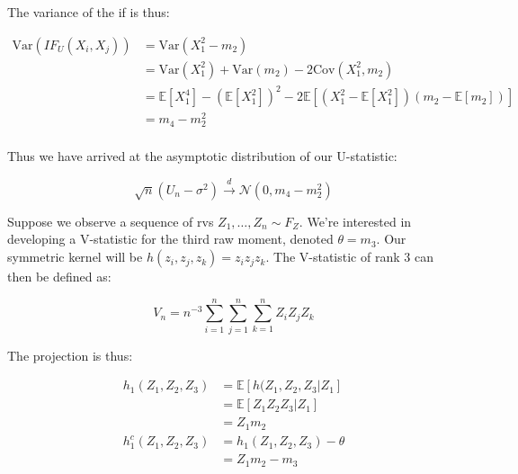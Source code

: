 \documentclass{report}
\begin{document}
The variance of the \gls{if} is thus:

\begin{equation}\label{eq:ex-lst-u-statistic-variance-if-variance}
    \begin{aligned}
        \text{Var}\left(IF_U(X_i, X_j)\right)
          &= \text{Var}(X_1^2 - m_2) \\
          &= \text{Var}(X_1^2) + \text{Var}(m_2) - 2\text{Cov}(X_1^2, m_2) \\
          &= \mathbb{E}[X_1^4] - \left(\mathbb{E}[X_1^2]\right)^2 - 2\mathbb{E}[(X_1^2 - \mathbb{E}[X_1^2])(m_2 - \mathbb{E}[m_2])] \\
          &= m_4 - m_2^2 \\
    \end{aligned}
\end{equation}

Thus we have arrived at the asymptotic distribution of our U-statistic:

\begin{equation}\label{eq:ex-lst-u-statistic-variance-asymptotics}
    \sqrt{n}(U_n - \sigma^2) \overset{d}{\to} \mathcal{N}(0, m_4 - m_2^2)
\end{equation}

Suppose we observe a sequence of \glspl{rv} $Z_1, \dots, Z_n \sim F_Z$. We're interested in developing a V-statistic for the third raw moment, denoted $\theta = m_3$. Our symmetric kernel will be $h(z_i, z_j, z_k) = z_iz_jz_k$. The V-statistic of rank 3 can then be defined as:

\begin{equation}\label{eq:ex-lst-v-statistic-m3}
    V_n = n^{-3} \sum_{i=1}^n \sum_{j=1}^n \sum_{k=1}^n Z_iZ_jZ_k
\end{equation}

The projection is thus:

\begin{equation}\label{eq:ex-lst-v-statistic-m3-projection}
    \begin{aligned}
        h_1(Z_1, Z_2, Z_3) 
          &= \mathbb{E}[h(Z_1, Z_2, Z_3 | Z_1] \\
          &= \mathbb{E}[Z_1Z_2Z_3 | Z_1] \\
          &= Z_1m_2 \\
        h_1^c(Z_1, Z_2, Z_3)
          &= h_1(Z_1, Z_2, Z_3) - \theta \\
          &= Z_1m_2 - m_3 \\
    \end{aligned}
\end{equation}
\end{document}
